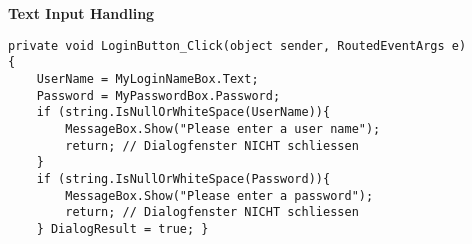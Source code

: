 \textbf{Text Input Handling}
\begin{lstlisting}
private void LoginButton_Click(object sender, RoutedEventArgs e)
{
	UserName = MyLoginNameBox.Text;
	Password = MyPasswordBox.Password;
	if (string.IsNullOrWhiteSpace(UserName)){
		MessageBox.Show("Please enter a user name");
		return; // Dialogfenster NICHT schliessen 
	}
	if (string.IsNullOrWhiteSpace(Password)){
		MessageBox.Show("Please enter a password");
		return; // Dialogfenster NICHT schliessen
	} DialogResult = true; }
\end{lstlisting}
